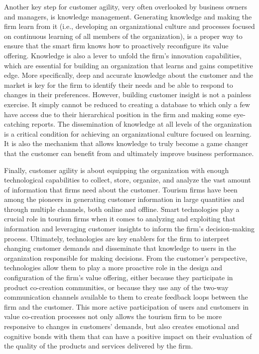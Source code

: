 \documentclass[
  letterpaper,
  DIV=11,
  numbers=noendperiod]{scrreprt}
\begin{document}
Another key step for customer agility, very often overlooked by business
owners and managers, is knowledge management. Generating knowledge and
making the firm learn from it (i.e., developing an organizational
culture and processes focused on continuous learning of all members of
the organization), is a proper way to ensure that the smart firm knows
how to proactively reconfigure its value offering. Knowledge is also a
lever to unfold the firm's innovation capabilities, which are essential
for building an organization that learns and gains competitive edge.
More specifically, deep and accurate knowledge about the customer and
the market is key for the firm to identify their needs and be able to
respond to changes in their preferences. However, building customer
insight is not a painless exercise. It simply cannot be reduced to
creating a database to which only a few have access due to their
hierarchical position in the firm and making some eye-catching reports.
The dissemination of knowledge at all levels of the organization is a
critical condition for achieving an organizational culture focused on
learning. It is also the mechanism that allows knowledge to truly become
a game changer that the customer can benefit from and ultimately improve
business performance.

Finally, customer agility is about equipping the organization with
enough technological capabilities to collect, store, organize, and
analyze the vast amount of information that firms need about the
customer. Tourism firms have been among the pioneers in generating
customer information in large quantities and through multiple channels,
both online and offline. Smart technologies play a crucial role in
tourism firms when it comes to analyzing and exploiting that information
and leveraging customer insights to inform the firm's decision-making
process. Ultimately, technologies are key enablers for the firm to
interpret changing customer demands and disseminate that knowledge to
users in the organization responsible for making decisions. From the
customer's perspective, technologies allow them to play a more proactive
role in the design and configuration of the firm's value offering,
either because they participate in product co-creation communities, or
because they use any of the two-way communication channels available to
them to create feedback loops between the firm and the customer. This
more active participation of users and customers in value co-creation
processes not only allows the tourism firm to be more responsive to
changes in customers' demands, but also creates emotional and cognitive
bonds with them that can have a positive impact on their evaluation of
the quality of the products and services delivered by the firm.
\end{document}
